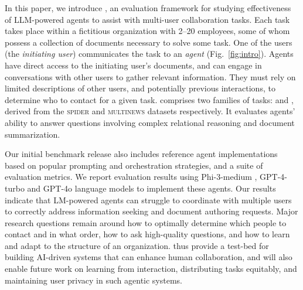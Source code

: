 In this paper, we introduce
\textbf{\asyncfw{}},
an evaluation framework for studying effectiveness of LLM-powered agents to assist with multi-user collaboration tasks.
Each \asyncfw{} task takes place within a fictitious organization with 2--20 employees, some of whom possess a collection of documents necessary to solve some task.
One of the users (the \emph{initiating user}) communicates the task to an \emph{agent} (Fig.~\ref{fig:intro}).
Agents have direct access to the initiating user's documents, and can engage in conversations with other users to gather relevant information. 
They must rely on limited descriptions of other users, and potentially previous interactions, to determine who to contact for a given task.
\asyncfw{} comprises two families of tasks: \textbf{\dataspider{}} and \textbf{\datanews{}}, derived from the \textsc{spider} \citep{yu2018spider} and \textsc{multinews} \citep{fabbri2019multi} datasets respectively. It evaluates 
agents' ability to answer questions involving complex relational reasoning and document summarization.

Our initial benchmark release also includes reference agent implementations based on popular
prompting and orchestration strategies, and a suite of evaluation metrics.
We report evaluation results using Phi-3-medium \cite{abdin2024phi}, GPT-4-turbo and GPT-4o \cite{openai2023gpt4} language models  to implement these agents. Our results indicate that LM-powered agents can struggle to coordinate with multiple users to correctly address information seeking and document authoring requests. Major research questions remain around how to optimally determine which people to contact and in what order, how to ask high-quality questions, and how to learn and adapt to the structure of an organization. 
\asyncfw{} thus provide a test-bed for building AI-driven systems that can enhance human collaboration, and will also enable future work on learning from interaction, distributing tasks equitably, and maintaining user privacy in such agentic systems.
